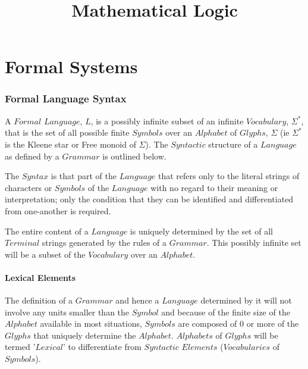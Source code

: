 \documentclass{article}
\begin{document}
\setcounter{secnumdepth}{5}
\setcounter{tocdepth}{5}


\title{Mathematical Logic}
\date{}
\maketitle


\tableofcontents


\part{Formal Systems}

\section{Formal Language Syntax}

A $Formal$ $Language$, $L$, is a possibly infinite subset of an
infinite $Vocabulary$, $\Sigma^*$, that is the set of all possible
finite $Symbols$ over an $Alphabet$ of $Glyphs$, $\Sigma$ (ie
$\Sigma^*$ is the Kleene star or Free monoid of $\Sigma$). The
$Syntactic$ structure of a $Language$ as defined by a $Grammar$ is
outlined below.

The $Syntax$ is that part of the $Language$ that refers only to the
literal strings of characters or $Symbols$ of the $Language$ with no
regard to their meaning or interpretation; only the condition that
they can be identified and differentiated from one-another is
required.

The entire content of a $Language$ is uniquely determined by the set
of all $Terminal$ strings generated by the rules of a $Grammar$. This
possibly infinite set will be a subset of the $Vocabulary$ over an
$Alphabet$.

\subsection{Lexical Elements}

The definition of a $Grammar$ and hence a $Language$ determined by it
will not involve any units smaller than the $Symbol$ and because of
the finite size of the $Alphabet$ available in most situations,
$Symbols$ are composed of 0 or more of the $Glyphs$ that uniquely
determine the $Alphabet$. $Alphabets$ of $Glyphs$ will be termed
'$Lexical$' to differentiate from $Syntactic$ $Elements$
($Vocabularies$ of $Symbols$).
\end{document}
